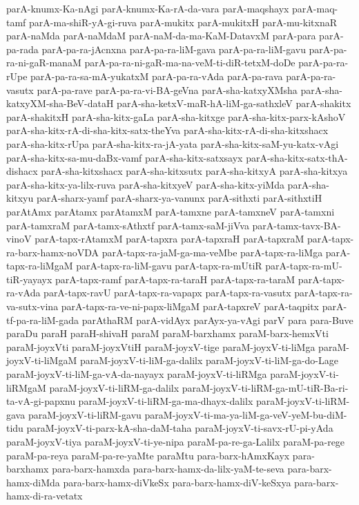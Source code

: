 {parA-knumx-Ka-nAgi
parA-knumx-Ka-rA-da-vara
parA-maqshayx
parA-maq-tamf
parA-ma-shiR-yA-gi-ruva
parA-mukitx
parA-mukitxH
parA-mu-kitxnaR
parA-naMda
parA-naMdaM
parA-naM-da-ma-KaM-DatavxM
parA-para
parA-pa-rada
parA-pa-ra-jAcnxna
parA-pa-ra-liM-gava
parA-pa-ra-liM-gavu
parA-pa-ra-ni-gaR-manaM
parA-pa-ra-ni-gaR-ma-na-veM-ti-diR-tetxM-doDe
parA-pa-ra-rUpe
parA-pa-ra-sa-mA-yukatxM
parA-pa-ra-vAda
parA-pa-rava
parA-pa-ra-vasutx
parA-pa-rave
parA-pa-ra-vi-BA-geVna
parA-sha-katxyXMsha
parA-sha-katxyXM-sha-BeV-dataH
parA-sha-ketxV-maR-hA-liM-ga-sathxleV
parA-shakitx
parA-shakitxH
parA-sha-kitx-gaLa
parA-sha-kitxge
parA-sha-kitx-parx-kAshoV
parA-sha-kitx-rA-di-sha-kitx-satx-theYva
parA-sha-kitx-rA-di-sha-kitxshacx
parA-sha-kitx-rUpa
parA-sha-kitx-ra-jA-yata
parA-sha-kitx-saM-yu-katx-vAgi
parA-sha-kitx-sa-mu-daBx-vamf
parA-sha-kitx-satxsayx
parA-sha-kitx-satx-thA-dishacx
parA-sha-kitxshacx
parA-sha-kitxsutx
parA-sha-kitxyA
parA-sha-kitxya
parA-sha-kitx-ya-lilx-ruva
parA-sha-kitxyeV
parA-sha-kitx-yiMda
parA-sha-kitxyu
parA-sharx-yamf
parA-sharx-ya-vanunx
parA-sithxti
parA-sithxtiH
parAtAmx
parAtamx
parAtamxM
parA-tamxne
parA-tamxneV
parA-tamxni
parA-tamxraM
parA-tamx-sAthxtf
parA-tamx-saM-jiVva
parA-tamx-tavx-BA-vinoV
parA-tapx-rAtamxM
parA-tapxra
parA-tapxraH
parA-tapxraM
parA-tapx-ra-barx-hamx-noVDA
parA-tapx-ra-jaM-ga-ma-veMbe
parA-tapx-ra-liMga
parA-tapx-ra-liMgaM
parA-tapx-ra-liM-gavu
parA-tapx-ra-mUtiR
parA-tapx-ra-mU-tiR-yayayx
parA-tapx-ramf
parA-tapx-ra-taraH
parA-tapx-ra-taraM
parA-tapx-ra-vAda
parA-tapx-ravU
parA-tapx-ra-vapapx
parA-tapx-ra-vasutx
parA-tapx-ra-va-sutx-vina
parA-tapx-ra-ve-ni-papx-liMgaM
parA-tapxreV
parA-taqpitx
parA-tf-pa-ra-liM-gada
parAthaRM
parA-vidAyx
parAyx-ya-vAgi
parV
para
para-Buve
paraDu
paraH
paraH-shivaH
paraM
paraM-barxhamx
paraM-barx-hemxVti
paraM-joyxVti
paraM-joyxVtiH
paraM-joyxV-tige
paraM-joyxV-ti-liMga
paraM-joyxV-ti-liMgaM
paraM-joyxV-ti-liM-ga-dalilx
paraM-joyxV-ti-liM-ga-do-Lage
paraM-joyxV-ti-liM-ga-vA-da-nayayx
paraM-joyxV-ti-liRMga
paraM-joyxV-ti-liRMgaM
paraM-joyxV-ti-liRM-ga-dalilx
paraM-joyxV-ti-liRM-ga-mU-tiR-Ba-ri-ta-vA-gi-papxnu
paraM-joyxV-ti-liRM-ga-ma-dhayx-dalilx
paraM-joyxV-ti-liRM-gava
paraM-joyxV-ti-liRM-gavu
paraM-joyxV-ti-ma-ya-liM-ga-veV-yeM-bu-diM-tidu
paraM-joyxV-ti-parx-kA-sha-daM-taha
paraM-joyxV-ti-savx-rU-pi-yAda
paraM-joyxV-tiya
paraM-joyxV-ti-ye-nipa
paraM-pa-re-ga-Lalilx
paraM-pa-rege
paraM-pa-reya
paraM-pa-re-yaMte
paraMtu
para-barx-hAmxKayx
para-barxhamx
para-barx-hamxda
para-barx-hamx-da-lilx-yaM-te-seva
para-barx-hamx-diMda
para-barx-hamx-diVkeSx
para-barx-hamx-diV-keSxya
para-barx-hamx-di-ra-vetatx
}
